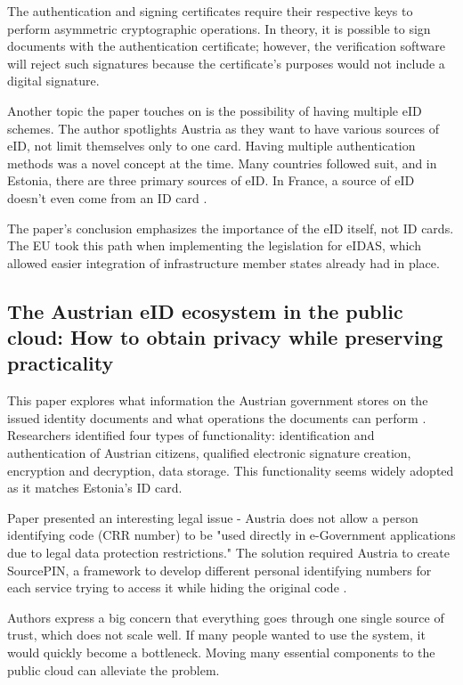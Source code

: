 The authentication and signing certificates require their respective keys to perform asymmetric cryptographic operations. In theory, it is possible to sign documents with the authentication certificate; however, the verification software will reject such signatures because the certificate's purposes would not include a digital signature.

Another topic the paper touches on is the possibility of having multiple eID schemes. The author spotlights Austria as they want to have various sources of eID, not limit themselves only to one card. Having multiple authentication methods was a novel concept at the time. Many countries followed suit, and in Estonia, there are three primary sources of eID. In France, a source of eID doesn't even come from an ID card \cite{eidas-notify-france}.

The paper's conclusion emphasizes the importance of the eID itself, not ID cards. The EU took this path when implementing the legislation for eIDAS, which allowed easier integration of infrastructure member states already had in place.

\subsection{The Austrian eID ecosystem in the public cloud: How to obtain privacy while preserving practicality}

This paper explores what information the Austrian government stores on the issued identity documents and what operations the documents can perform \cite{ZWATTENDORFER201635}. Researchers identified four types of functionality: identification and authentication of Austrian citizens, qualified electronic signature creation, encryption and decryption, data storage. This functionality seems widely adopted as it matches Estonia's ID card.

Paper presented an interesting legal issue - Austria does not allow a person identifying code (CRR number) to be "used directly in e-Government applications due to legal data protection restrictions." The solution required Austria to create SourcePIN, a framework to develop different personal identifying numbers for each service trying to access it while hiding the original code \cite{ZWATTENDORFER201635,austria-eid-presentation}.

Authors express a big concern that everything goes through one single source of trust, which does not scale well. If many people wanted to use the system, it would quickly become a bottleneck. Moving many essential components to the public cloud can alleviate the problem.

